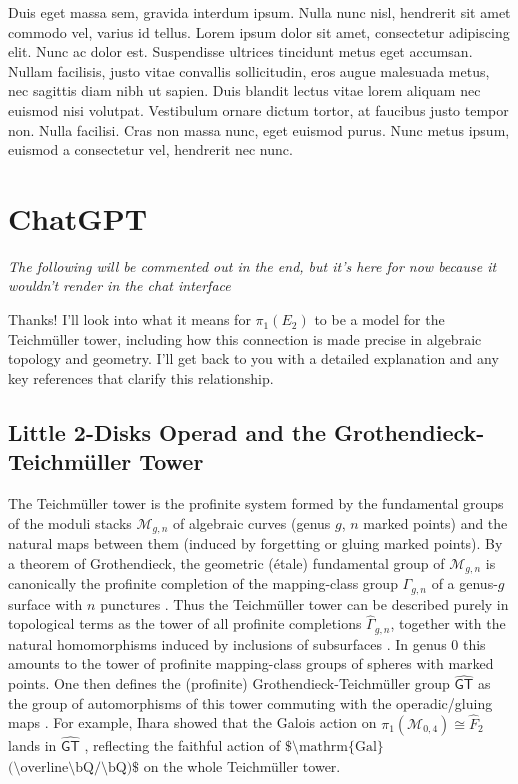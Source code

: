 Duis eget massa sem, gravida interdum ipsum. Nulla nunc nisl, hendrerit sit amet commodo vel, varius id tellus. Lorem ipsum dolor sit amet, consectetur adipiscing elit. Nunc ac dolor est. Suspendisse ultrices tincidunt metus eget accumsan. Nullam facilisis, justo vitae convallis sollicitudin, eros augue malesuada metus, nec sagittis diam nibh ut sapien. Duis blandit lectus vitae lorem aliquam nec euismod nisi volutpat. Vestibulum ornare dictum tortor, at faucibus justo tempor non. Nulla facilisi. Cras non massa nunc, eget euismod purus. Nunc metus ipsum, euismod a consectetur vel, hendrerit nec nunc.
\section{ChatGPT}
\emph{The following will be commented out in the end, but it's here for now because it wouldn't render in the chat interface}

Thanks! I'll look into what it means for $\pi_1(E_2)$ to be a model for the Teichm\"uller tower, including how this connection is made precise in algebraic topology and geometry.
I'll get back to you with a detailed explanation and any key references that clarify this relationship.


\subsection{Little 2-Disks Operad and the Grothendieck-Teichm\"uller Tower}

The Teichm\"uller tower is the profinite system formed by the fundamental groups of the moduli stacks $\mathcal{M}_{g,n}$ of algebraic curves (genus $g$, $n$ marked points) and the natural maps between them (induced by forgetting or gluing marked points).  By a theorem of Grothendieck, the geometric (\'etale) fundamental group of $\mathcal{M}_{g,n}$ is canonically the profinite completion of the mapping-class group $\Gamma_{g,n}$ of a genus-$g$ surface with $n$ punctures \cite{de_Brito_Horel_Robertson_2019}. Thus the Teichm\"uller tower can be described purely in topological terms as the tower of all profinite completions $\widehat\Gamma_{g,n}$, together with the natural homomorphisms induced by inclusions of subsurfaces \cite{Borghi_Robertson_2025}. In genus 0 this amounts to the tower of profinite mapping-class groups of spheres with marked points.  One then defines the (profinite) Grothendieck-Teichm\"uller group $\widehat{\mathsf{GT}}$ as the group of automorphisms of this tower commuting with the operadic/gluing maps \cite{de_Brito_Horel_Robertson_2019}. For example, Ihara showed that the Galois action on $\pi_1(\mathcal{M}_{0,4})\cong\widehat F_2$ lands in $\widehat{\mathsf{GT}}$ \cite{de_Brito_Horel_Robertson_2019}, reflecting the faithful action of $\mathrm{Gal}(\overline\bQ/\bQ)$ on the whole Teichm\"uller tower.

